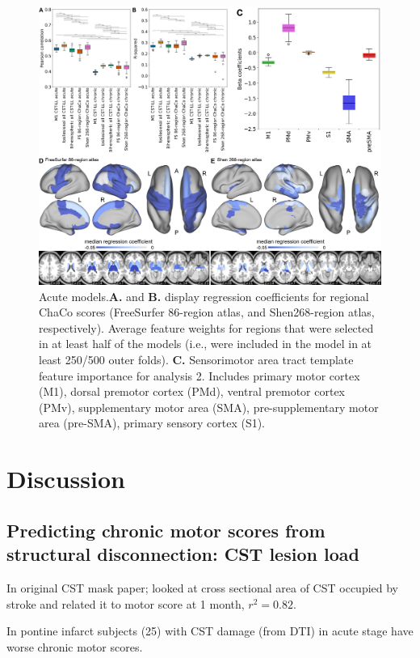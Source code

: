 \documentclass[10pt]{article}
\begin{document}
\begin{figure}[htp]
\centering
\includegraphics[width=1\linewidth]{figures/Analysis6.png}
\caption{Acute models.\textbf{A.} and \textbf{B.} display regression coefficients for regional ChaCo scores (FreeSurfer 86-region atlas, and Shen268-region atlas, respectively). Average feature weights for regions that were selected in at least half of the models (i.e., were included in the model in at least 250/500 outer folds). \textbf{C.} Sensorimotor area tract template feature importance for analysis 2. Includes primary motor cortex (M1), dorsal premotor cortex (PMd), ventral premotor cortex (PMv), supplementary motor area (SMA), pre-supplementary motor area (pre-SMA), primary sensory cortex (S1).}
\label{nemotool}
\end{figure}


\section{Discussion}

\subsection*{Predicting chronic motor scores from structural disconnection: CST lesion load}
In \cite{Pineiro2000-dv} original CST mask paper; looked at cross sectional area of CST occupied by stroke and related it to motor score at 1 month, $r^2 = 0.82$.

In \cite{Jang2008-ns} pontine infarct subjects (25) with CST damage (from DTI) in acute stage have worse chronic motor scores. 
\end{document}
